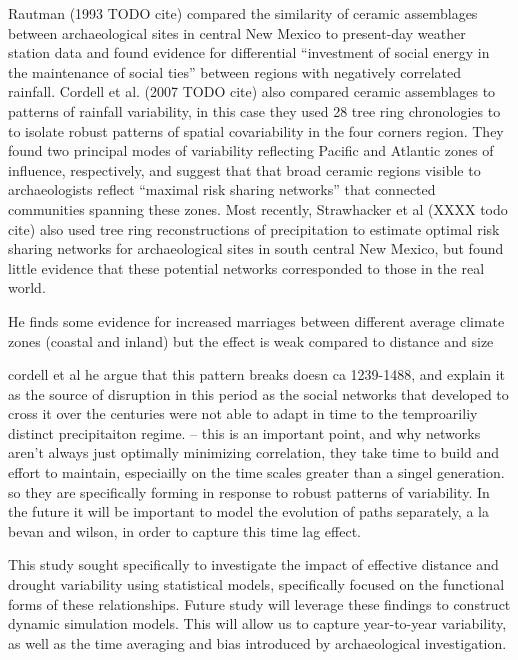 \documentclass[fleqn,10pt]{wlscirep}
\begin{document}
Rautman (1993 TODO cite) compared the similarity of ceramic assemblages between archaeological sites in central New Mexico to present-day weather station data and found evidence for differential ``investment of social energy in the maintenance of social ties'' between regions with negatively correlated rainfall. Cordell et al. (2007 TODO cite) also compared ceramic assemblages to patterns of rainfall variability, in this case they used 28 tree ring chronologies to to isolate robust patterns of spatial covariability in the four corners region. They found two principal modes of variability reflecting Pacific and Atlantic zones of influence, respectively, and suggest that that broad ceramic regions visible to archaeologists reflect ``maximal risk sharing networks'' that connected communities spanning these zones. Most recently, Strawhacker et al (XXXX todo cite) also used tree ring reconstructions of precipitation to estimate optimal risk sharing networks for archaeological sites in south central New Mexico, but found little evidence that these potential networks corresponded to those in the real world.


He finds some evidence for increased marriages between different average climate zones (coastal and inland) but the effect is weak compared to distance and  size


cordell et al he argue that this pattern breaks doesn ca 1239-1488, and explain it as the source of disruption in this period as the social networks that developed to cross it over the centuries were not able to adapt in time to the temproariliy distinct precipitaiton regime. -- this is an important point, and why networks aren't always just optimally minimizing correlation, they take time to build and effort to maintain, especiailly on the time scales greater than a singel generation. so they are specifically forming in response to robust patterns of variability. In the future it will be important to model the evolution of paths separately, a la bevan and wilson, in order to capture this time lag effect.

This study sought specifically to investigate the impact of effective distance and drought variability using statistical models, specifically focused on the functional forms of these relationships. Future study will leverage these findings to construct dynamic simulation models. This will allow us to capture year-to-year variability, as well as the time averaging and bias introduced by archaeological investigation.
\end{document}

